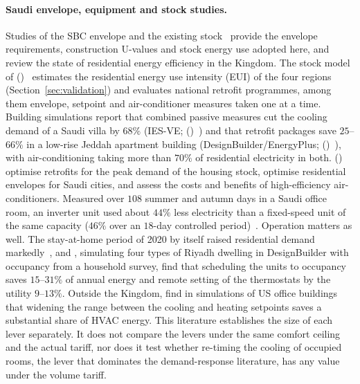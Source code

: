 \documentclass[10pt,a4paper,twocolumn]{article}
\newcommand{\citey}[1]{\citeauthor{#1} (\citeyear{#1})~\citep{#1}}
\theoremstyle{definition}
\begin{document}
\paragraph{Saudi envelope, equipment and stock studies.}
Studies of the SBC envelope and the existing stock~\citep{alayed2021thermal,alsanea_insulation2022,alyami2021building,sbc_envelope2021} provide the envelope requirements, construction U-values and stock energy use adopted here, and \citet{alhomoud2021review} review the state of residential energy efficiency in the Kingdom. The stock model of \citey{stockmodel2020} estimates the residential energy use intensity (EUI) of the four regions (Section~\ref{sec:validation}) and evaluates national retrofit programmes, among them envelope, setpoint and air-conditioner measures taken one at a time. Building simulations report that combined passive measures cut the cooling demand of a Saudi villa by $68\%$ (IES-VE; \citey{passive_saudi2025}) and that retrofit packages save $25$--$66\%$ in a low-rise Jeddah apartment building (DesignBuilder/EnergyPlus; \citey{retrofit_jeddah2023}), with air-conditioning taking more than $70\%$ of residential electricity in both. \citey{krarti_peak2022} optimise retrofits for the peak demand of the housing stock, \citet{alaidroos2015envelope} optimise residential envelopes for Saudi cities, and \citet{krarti2020ac} assess the costs and benefits of high-efficiency air-conditioners. Measured over $108$ summer and autumn days in a Saudi office room, an inverter unit used about $44\%$ less electricity than a fixed-speed unit of the same capacity ($46\%$ over an $18$-day controlled period)~\citep{almogbel2020inverter}. Operation matters as well. The stay-at-home period of 2020 by itself raised residential demand markedly~\citep{aldubyan_stayhome2022}, and \citet{alshahrani2019smart}, simulating four types of Riyadh dwelling in DesignBuilder with occupancy from a household survey, find that scheduling the units to occupancy saves $15$--$31\%$ of annual energy and remote setting of the thermostats by the utility $9$--$13\%$. Outside the Kingdom, \citet{hoyt2015setpoint} find in simulations of US office buildings that widening the range between the cooling and heating setpoints saves a substantial share of HVAC energy. This literature establishes the size of each lever separately. It does not compare the levers under the same comfort ceiling and the actual tariff, nor does it test whether re-timing the cooling of occupied rooms, the lever that dominates the demand-response literature, has any value under the volume tariff.
\end{document}

